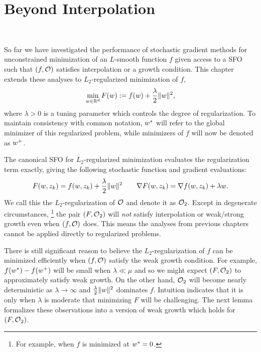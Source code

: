
\chapter{Beyond Interpolation}~\label{ch:beyond-interpolation}

So far we have investigated the performance of stochastic gradient methods for unconstrained minimization of an \( L \)-smooth function \( f \) given access to a \ac{SFO} \oracle{} such that \( \rbr{f, \oracle{}} \) satisfies interpolation or a growth condition. 
This chapter extends these analyses to \( L_2 \)-regularized minimization of \( f \), 
\begin{align}
    \min_{\w \in \R^d} F(\w) := f(\w) + \frac{\lambda}{2} \norm{\w}^2,\label{eq:l2-reguarlized-problem}
\end{align}
where \( \lambda > 0 \) is a tuning parameter which controls the degree of regularization. 
To maintain consistency with common notation, \( \wopt \) will refer to the global minimizer of this regularized problem, while minimizers of \( f \) will now be denoted as \( \wbar \).

The canonical \ac{SFO} for \( L_2 \)-regularized minimization evaluates the regularization term exactly, giving the following stochastic function and gradient evaluations: 
\[ F(\w, \zk) = f(\w, \zk) + \frac{\lambda}{2} \norm{\w}^2 \quad \quad \nabla F(\w, \zk) = \grad(\w, \zk) + \lambda \w.  \]
We call this the \( L_2 \)-regularization of \( \oracle{} \) and denote it as \( \oracle{}_2 \).
Except in degenerate circumstances,%
\footnote{For example, when \( f \) is minimized at \( \wopt = 0 \).}%
the pair \( \rbr{F, \oracle{}_2} \) will \emph{not} satisfy interpolation or weak/strong growth even when \( \rbr{f, \oracle{}} \) does. 
This means the analyses from previous chapters cannot be applied directly to regularized problems.

There is still significant reason to believe the \( L_2 \)-regularization of \( f \) can be minimized efficiently when \( \rbr{f, \oracle{}} \) satisfy the weak growth condition.
For example, \( f(\wopt) - f(\wbar) \) will be small when \( \lambda \ll \mu \) and so we might expect \( \rbr{F, \oracle{}_2} \) to approximately satisfy weak growth. 
On the other hand, \( \oracle{}_2 \) will become nearly deterministic as \( \lambda \rightarrow \infty \) and \( \frac{\lambda}{2} \norm{\w}^2 \) dominates \( f \).
Intuition indicates that it is only when \( \lambda \) is moderate that minimizing \( F \) will be challenging.
The next lemma formalizes these observations into a version of weak growth which holds for \( \rbr{F, \oracle{}_2} \).

